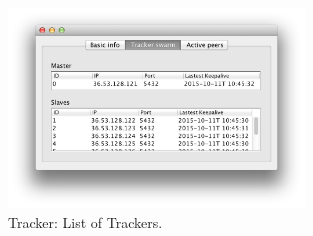 \documentclass[twoside,a4paper,10pt]{article}
\begin{document}
\begin{figure}[!htp]
  \centering
  \includegraphics[width=0.7\textwidth]{imgs/tracker/trakerSwarm.png}
  \caption{\label{fig:trackerSwarm}Tracker: List of Trackers.}
\end{figure}



\end{document}
